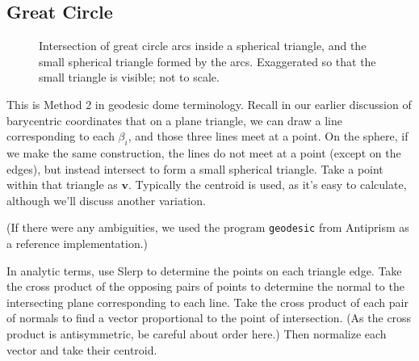 \documentclass{amsart}[12pt]
\begin{document}
\subsection{Great Circle}
\begin{figure}%
\caption{Intersection of great circle arcs inside a spherical triangle,
and the small spherical triangle formed by the arcs. Exaggerated so that the
small triangle is visible; not to scale.}
\label{fig:intlines}
\end{figure}
This is Method 2 in geodesic dome terminology. Recall in our earlier discussion of barycentric coordinates that on a plane triangle, we can draw a line corresponding to each $\beta_i$, and those three lines meet at a point. On the sphere, if we make the same construction, the lines do not meet at a point (except on the edges), but instead intersect to form a small spherical triangle. Take a point within that triangle as $\mathbf v$. Typically the centroid is used, as it's easy to calculate, although we'll discuss another variation.

(If there were any ambiguities, we used the program \texttt{geodesic} from Antiprism\cite{antiprism} as a reference implementation.)

In analytic terms, use Slerp to determine the points on each triangle edge. Take the cross product of the opposing pairs of points to determine the normal to the intersecting plane corresponding to each line. Take the cross product of each pair of normals to find a vector proportional to the point of intersection. (As the cross product is antisymmetric, be careful about order here.) Then normalize each vector and take their centroid.
\end{document}
